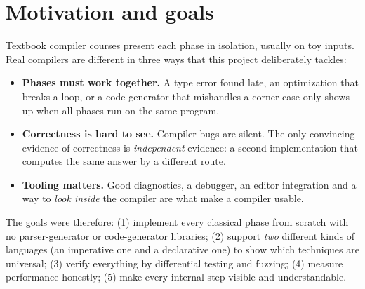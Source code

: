 \section{Motivation and goals}
Textbook compiler courses present each phase in isolation, usually on toy inputs. Real compilers are different in three ways that this project deliberately tackles:

\begin{itemize}
  \item \textbf{Phases must work together.} A type error found late, an optimization that breaks a loop, or a code generator that mishandles a corner case only shows up when all phases run on the same program.
  \item \textbf{Correctness is hard to see.} Compiler bugs are silent. The only convincing evidence of correctness is \emph{independent} evidence: a second implementation that computes the same answer by a different route.
  \item \textbf{Tooling matters.} Good diagnostics, a debugger, an editor integration and a way to \emph{look inside} the compiler are what make a compiler usable.
\end{itemize}

The goals were therefore: (1) implement every classical phase from scratch with no parser-generator or code-generator libraries; (2) support \emph{two} different kinds of languages (an imperative one and a declarative one) to show which techniques are universal; (3) verify everything by differential testing and fuzzing; (4) measure performance honestly; (5) make every internal step visible and understandable.

